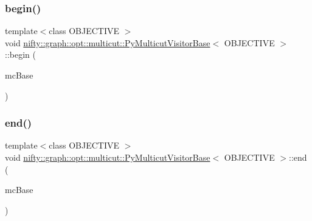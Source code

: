 \mbox{\label{classnifty_1_1graph_1_1opt_1_1multicut_1_1PyMulticutVisitorBase_a4c31ac6a81426f9da50d75bd6af9fc06}} 
\subsubsection{\texorpdfstring{begin()}{begin()}\hspace{0.1cm}{\footnotesize\ttfamily [2/2]}}
{\footnotesize\ttfamily template$<$class O\+B\+J\+E\+C\+T\+I\+VE $>$ \\
void \hyperlink{classnifty_1_1graph_1_1opt_1_1multicut_1_1PyMulticutVisitorBase}{nifty\+::graph\+::opt\+::multicut\+::\+Py\+Multicut\+Visitor\+Base}$<$ O\+B\+J\+E\+C\+T\+I\+VE $>$\+::begin (\begin{DoxyParamCaption}\item[{\hyperlink{classnifty_1_1graph_1_1opt_1_1multicut_1_1PyMulticutVisitorBase_aa6d9f36fb629bf51dadbc1018595cb14}{Mc\+Base} $\ast$}]{mc\+Base }\end{DoxyParamCaption})\hspace{0.3cm}{\ttfamily [inline]}}

\mbox{\label{classnifty_1_1graph_1_1opt_1_1multicut_1_1PyMulticutVisitorBase_acbe660f5feb2f3d62dbac1ecf7728fc3}} 
\subsubsection{\texorpdfstring{end()}{end()}\hspace{0.1cm}{\footnotesize\ttfamily [1/2]}}
{\footnotesize\ttfamily template$<$class O\+B\+J\+E\+C\+T\+I\+VE $>$ \\
void \hyperlink{classnifty_1_1graph_1_1opt_1_1multicut_1_1PyMulticutVisitorBase}{nifty\+::graph\+::opt\+::multicut\+::\+Py\+Multicut\+Visitor\+Base}$<$ O\+B\+J\+E\+C\+T\+I\+VE $>$\+::end (\begin{DoxyParamCaption}\item[{\hyperlink{classnifty_1_1graph_1_1opt_1_1multicut_1_1PyMulticutVisitorBase_aa6d9f36fb629bf51dadbc1018595cb14}{Mc\+Base} $\ast$}]{mc\+Base }\end{DoxyParamCaption})\hspace{0.3cm}{\ttfamily [inline]}}

